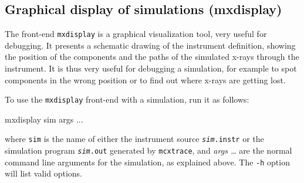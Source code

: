 \subsection{Graphical display of simulations (mxdisplay)}
\label{s:mxdisplay}

The front-end \verb+mxdisplay+ is a graphical
visualization tool, very useful for debugging.  It presents a schematic drawing
of the instrument definition, showing the position of the components and the
paths of the simulated x-rays through the instrument. It is thus very useful
for debugging a simulation, for example to spot components in the wrong position
or to find out where x-rays are getting lost.

To use the \verb+mxdisplay+ front-end with a simulation, run it as
follows:
\begin{bash}
mxdisplay sim args ...
\end{bash}

where \verb+sim+ is the name of either the instrument source
\texttt{\textit{sim}.instr} or the simulation program \texttt{\textit{sim}.out} generated by \texttt{mcxtrace},
and \textit{args \ldots} are the normal command line arguments for the
simulation, as explained above. The \verb+-h+ option will list valid options.

